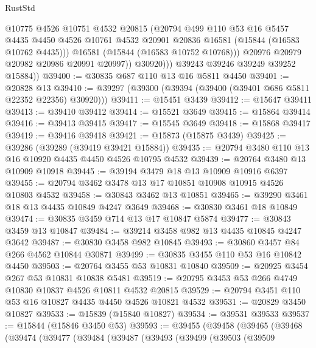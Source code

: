 \begin{lexlean}{RustStd}
\begin{coremodule}
                    @10775
                    @4526
                    @10751
                    @4532
                    @20815
                    (@20794
                      @499
                      @110
                      @53
                      @16
                      @5457
                      @4435
                      @4450
                      @4526
                      @10761
                      @4532
                      @20901
                      @20836
                      @16581
                      (@15844 (@16583 @10762 @4435)))
                    @16581
                    (@15844 (@16583 @10752 @10768)))
                  @20976
                  @20979
                  @20982
                  @20986
                  @20991
                  @20997))
              @30920)))
        @39243
        @39246
        @39249
        @39252
        @15884))
@39400 := @30835 @687 @110 @13 @16 @5811 @4450
@39401 := @20828 @13
@39410 := @39297 (@39300 (@39394 (@39400 (@39401 @686 @5811 @22352 @22356) @30920)))
@39411 := @15451 @3439
@39412 := @15647 @39411
@39413 := @39410 @39412
@39414 := @15521 @3649
@39415 := @15864 @39414
@39416 := @39413 @39415
@39417 := @15545 @3649
@39418 := @15868 @39417
@39419 := @39416 @39418
@39421 := @15873 (@15875 @3439)
@39425 := @39286 (@39289 (@39419 @39421 @15884))
@39435 := @20794 @3480 @110 @13 @16 @10920 @4435 @4450 @4526 @10795 @4532
@39439 := @20764 @3480 @13 @10909 @10918
@39445 := @39194 @3479 @18 @13 @10909 @10916 @6397
@39455 := @20794 @3462 @3478 @13 @17 @10851 @10908 @10915 @4526 @10803 @4532
@39458 := @30843 @3462 @13 @10851
@39465 := @39290 @3461 @18 @13 @4435 @10849 @4247 @3649
@39468 := @30830 @3461 @18 @10849
@39474 := @30835 @3459 @714 @13 @17 @10847 @5874
@39477 := @30843 @3459 @13 @10847
@39484 := @39214 @3458 @982 @13 @4435 @10845 @4247 @3642
@39487 := @30830 @3458 @982 @10845
@39493 := @30860 @3457 @84 @266 @4562 @10844 @30871
@39499 := @30835 @3455 @110 @53 @16 @10842 @4450
@39503 := @20764 @3455 @53 @10831 @10840
@39509 := @20925 @3454 @267 @53 @10831 @10838 @5481
@39519 := @20795 @3453 @53 @266 @4749 @10830 @10837 @4526 @10811 @4532 @20815
@39529 := @20794 @3451 @110 @53 @16 @10827 @4435 @4450 @4526 @10821 @4532
@39531 := @20829 @3450 @10827
@39533 := @15839 (@15840 @10827)
@39534 := @39531 @39533
@39537 := @15844 (@15846 @3450 @53)
@39593 := @39455
    (@39458
      (@39465
        (@39468
          (@39474
            (@39477
              (@39484
                (@39487
                  (@39493
                    (@39499
                      (@39503
                        (@39509

\end{coremodule}
\end{lexlean}
